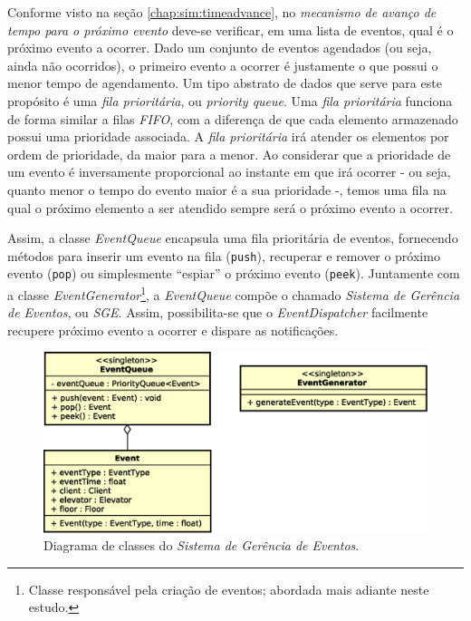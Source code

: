 Conforme visto na seção \ref{chap:sim:timeadvance}, no \textit{mecanismo de
avanço de tempo para o próximo evento} deve-se verificar, em uma lista de
eventos, qual é o próximo evento a ocorrer. Dado um conjunto de eventos
agendados (ou seja, ainda não ocorridos), o primeiro evento a ocorrer é
justamente o que possui o menor tempo de agendamento. Um tipo abstrato de dados
que serve para este propósito é uma \textit{fila prioritária}, ou
\textit{priority queue}. Uma \textit{fila prioritária} funciona de forma similar
a filas \textit{FIFO}, com a diferença de que cada elemento armazenado possui
uma prioridade associada. A \textit{fila prioritária} irá atender os elementos
por ordem de prioridade, da maior para a menor. Ao considerar que a prioridade
de um evento é inversamente proporcional ao instante em que irá ocorrer - ou
seja, quanto menor o tempo do evento maior é a sua prioridade -, temos uma fila
na qual o próximo elemento a ser atendido sempre será o próximo evento a
ocorrer.

Assim, a classe \textit{EventQueue} encapsula uma fila prioritária de eventos,
fornecendo métodos para inserir um evento na fila (\texttt{push}), recuperar e
remover o próximo evento (\texttt{pop}) ou simplesmente ``espiar'' o próximo
evento (\texttt{peek}). Juntamente com a classe
\textit{EventGenerator}\footnote{Classe responsável pela criação de eventos;
abordada mais adiante neste estudo.}, a \textit{EventQueue} compõe o chamado
\textit{Sistema de Gerência de Eventos}, ou \textit{SGE}. Assim, possibilita-se
que o \textit{EventDispatcher} facilmente recupere próximo evento a ocorrer e
dispare as notificações.

\begin{figure}[htb!]
  \centering
  \includegraphics[scale=0.6]{img/EventManagement.eps}
  \caption{Diagrama de classes do \textit{Sistema de Gerência de Eventos}.}
\label{fig:diagram:event:manage}
\end{figure}

